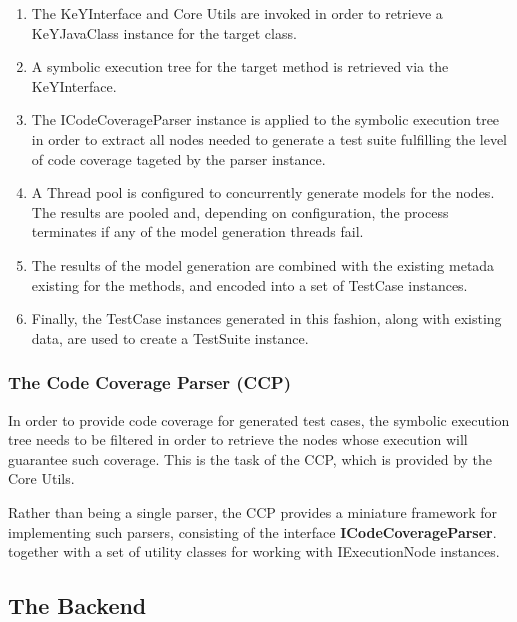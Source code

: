 \documentclass{article}
\newcommand{\tmstrong}[1]{\textbf{#1}}
\newenvironment{enumeratenumeric}{\begin{enumerate}[1.] }{\end{enumerate}}
\begin{document}
\begin{enumeratenumeric}
  \item The KeYInterface and Core Utils are invoked in order to retrieve a
  KeYJavaClass instance for the target class.
  
  \item A symbolic execution tree for the target method is retrieved via the
  KeYInterface.
  
  \item The ICodeCoverageParser instance is applied to the symbolic execution
  tree in order to extract all nodes needed to generate a test suite
  fulfilling the level of code coverage tageted by the parser instance.
  
  \item A Thread pool is configured to concurrently generate models for the
  nodes. The results are pooled and, depending on configuration, the process
  terminates if any of the model generation threads fail.
  
  \item The results of the model generation are combined with the existing
  metada existing for the methods, and encoded into a set of TestCase
  instances.
  
  \item Finally, the TestCase instances generated in this fashion, along with
  existing data, are used to create a TestSuite instance.
\end{enumeratenumeric}


\subsubsection{The Code Coverage Parser (CCP)}

In order to provide code coverage for generated test cases, the symbolic
execution tree needs to be filtered in order to retrieve the nodes whose
execution will guarantee such coverage. This is the task of the CCP, which is
provided by the Core Utils.



Rather than being a single parser, the CCP provides a miniature framework for
implementing such parsers, consisting of the interface
{\tmstrong{ICodeCoverageParser}}. together with a set of utility classes for
working with IExecutionNode instances.

\subsection{The Backend}
\end{document}
